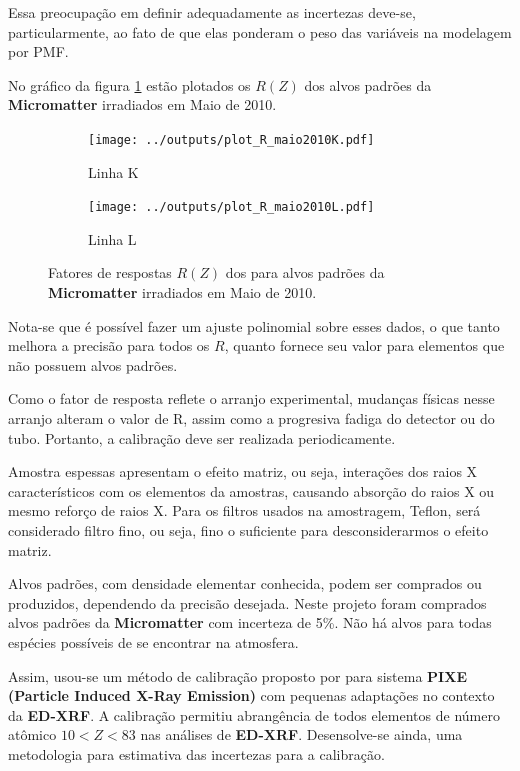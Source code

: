 Essa preocupação em definir adequadamente as incertezas deve-se, particularmente, ao fato de que elas ponderam o peso das variáveis na modelagem por PMF.

No gráfico da figura \ref{fg:edxrfcalib} estão plotados os $R(Z)$ 
dos alvos padrões da \textbf{Micromatter} irradiados em Maio de 2010. 

\begin{figure}[H]
  \begin{subfigure}[b]{0.45\textwidth}
    \texttt{[image: ../outputs/plot\_R\_maio2010K.pdf]}
    \caption{Linha K}
  \end{subfigure}%
  \begin{subfigure}[b]{0.45\textwidth}
    \texttt{[image: ../outputs/plot\_R\_maio2010L.pdf]}
    \caption{Linha L}
  \end{subfigure}
  \caption{Fatores de respostas $R(Z)$ dos para alvos padrões da 
           \textbf{Micromatter} irradiados em Maio de 2010. 
           \label{fg:edxrfcalib}}
\end{figure}

Nota-se que é possível fazer um ajuste polinomial sobre esses dados, o que tanto melhora a precisão para todos os $R$, quanto fornece seu valor para elementos que não possuem alvos padrões.

Como o fator de resposta reflete o arranjo experimental, mudanças físicas
nesse arranjo alteram o valor de R, assim como a progresiva fadiga do detector
ou do tubo. Portanto, a calibração deve ser realizada periodicamente.



Amostra espessas apresentam o efeito matriz, ou seja, interações dos 
raios X característicos com os elementos da amostras, causando 
absorção do raios X ou mesmo reforço de raios X. 
Para os filtros usados na amostragem, Teflon, será considerado filtro
fino, ou seja, fino o suficiente para desconsiderarmos o efeito matriz.

Alvos padrões, com densidade elementar conhecida, podem ser 
comprados ou produzidos, dependendo da precisão desejada.
Neste projeto foram comprados alvos padrões da \textbf{Micromatter}
com incerteza de 5\%. 
Não há alvos para todas espécies possíveis de se encontrar na atmosfera. 

Assim, usou-se um método de calibração proposto por \citep{tabacniks2000}
para sistema \textbf{PIXE (Particle Induced X-Ray Emission)} com pequenas
adaptações no contexto da \textbf{ED-XRF}.   
A calibração permitiu abrangência de todos elementos de número atômico 
$ 10 < Z < 83$ nas análises de \textbf{ED-XRF}. 
Desensolve-se ainda, uma metodologia para estimativa das incertezas
para a calibração.   

